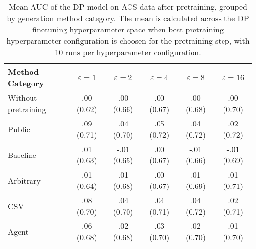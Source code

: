 \begin{table}[h!]
    \centering
    \caption{Mean AUC of the DP model on ACS data after pretraining, grouped by generation method category. The mean is calculated across the DP finetuning hyperparameter space when best pretraining hyperparameter configuration is choosen for the pretraining step, with 10 runs per hyperparameter configuration.}
    \label{tab:epsilon_comparison}
    \begin{tabular}{lccccc}
    \toprule
    Method Category & $\varepsilon=1$ & $\varepsilon=2$ & $\varepsilon=4$ & $\varepsilon=8$ & $\varepsilon=16$ \\
    \midrule
    Without pretraining & .00 {\small (0.62)} & .00 {\small (0.66)} & .00 {\small (0.67)} & .00 {\small (0.68)} & .00 {\small (0.70)} \\
    \arrayrulecolor{black!50!}\midrule
    Public & \cellcolor{gold!30}.09 {\small (0.71)} & \cellcolor{gold!30}.04 {\small (0.70)} & \cellcolor{gold!30}.05 {\small (0.72)} & \cellcolor{gold!30}.04 {\small (0.72)} & \cellcolor{gold!30}.02 {\small (0.72)} \\
    \arrayrulecolor{black!50!}\midrule
    Baseline & .01 {\small (0.63)} & -.01 {\small (0.65)} & .00 {\small (0.67)} & -.01 {\small (0.66)} & -.01 {\small (0.69)} \\
    \arrayrulecolor{black!50!}\midrule
    Arbitrary & .01 {\small (0.64)} & .01 {\small (0.68)} & .00 {\small (0.67)} & .01 {\small (0.69)} & \cellcolor{bronze!30}.01 {\small (0.71)} \\
    \arrayrulecolor{black!50!}\midrule
    CSV & \cellcolor{silver!30}.08 {\small (0.70)} & \cellcolor{silver!30}.04 {\small (0.70)} & \cellcolor{silver!30}.04 {\small (0.71)} & \cellcolor{silver!30}.04 {\small (0.72)} & \cellcolor{silver!30}.02 {\small (0.71)} \\
    Agent & \cellcolor{bronze!30}.06 {\small (0.68)} & \cellcolor{bronze!30}.02 {\small (0.68)} & \cellcolor{bronze!30}.03 {\small (0.70)} & \cellcolor{bronze!30}.02 {\small (0.70)} & .01 {\small (0.70)} \\
    \bottomrule
    \end{tabular}
\end{table}